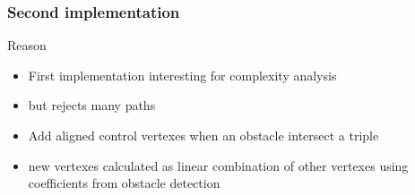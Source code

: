 \begin{frame}
  \frametitle{Second implementation}
  \begin{block}{Reason}
    \begin{itemize}
    \item \alert{First} implementation interesting for complexity
      analysis\pause
    \item[\xmark] but \alert{rejects} many paths
    \end{itemize}
  \end{block}\pause
  \begin{itemize}
  \item \alert{Add} aligned control vertexes when an obstacle intersect a triple
    \begin{center}
    \end{center}\pause
  \item new vertexes calculated as linear \alert{combination} of other
    vertexes using \alert{coefficients} from obstacle detection
  \end{itemize}
\end{frame}

